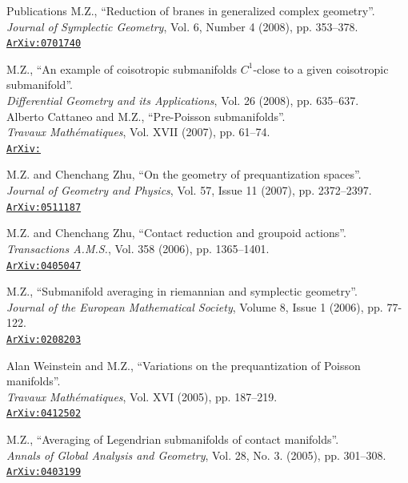 \documentclass[12p]{resume}
\newcommand{\arxiv}[1]{\href{http://arxiv.org/abs/#1}{\texttt{ArXiv:\allowbreak#1}}}%
\begin{document}
\begin{category}{Publi\-cations}
\citembullet  M.Z., ``Reduction of branes in generalized complex geometry''.\\
\textit{Journal of Symplectic Geometry}, Vol. 6, Number 4 (2008), pp. 353--378. \\
\href{https://arxiv.org/abs/math/0701740}{\texttt{ArXiv:0701740}}

\citembullet
M.Z., ``An example of coisotropic submanifolds $C^1$-close to a given coisotropic submanifold''.\\
\textit{Differential Geometry and its Applications}, Vol. 26 (2008), pp. 635--637.\\
 

\citembullet  Alberto Cattaneo and M.Z., ``Pre-Poisson submanifolds''.\\\textit{Travaux Math\'ematiques}, Vol. XVII (2007), pp. 61--74.\\
\arxiv{0710.5772}

\citembullet  M.Z. and Chenchang Zhu, ``On the geometry of prequantization spaces''.\\
\textit{Journal of Geometry and Physics},
Vol. 57, Issue 11 (2007), pp. 2372--2397.\\
\href{https://arxiv.org/abs/math/0511187}{\texttt{ArXiv:0511187}}

\citembullet M.Z. and Chenchang Zhu, ``Contact reduction and groupoid actions''.\\
\textit{Transactions A.M.S.}, Vol. 358 (2006), pp. 1365--1401.\\
\href{https://arxiv.org/abs/math/0405047}{\texttt{ArXiv:0405047}}

\citembullet M.Z., ``Submanifold averaging in riemannian and symplectic geometry''.\\
\textit{Journal of the European Mathematical Society}, Volume 8, Issue 1 (2006), pp. 77-122.\\
\href{https://arxiv.org/abs/math/0208203}{\texttt{ArXiv:0208203}}

\citembullet
Alan Weinstein and M.Z., ``Variations on the prequantization of Poisson manifolds''.\\
\textit{Travaux Math\'ematiques}, Vol. XVI (2005), pp. 187--219.\\
\href{https://arxiv.org/abs/math/0412502}{\texttt{ArXiv:0412502}}

\citembullet
M.Z., ``Averaging of Legendrian submanifolds of contact manifolds''. \\
\textit{Annals of Global Analysis and Geometry}, Vol. 28, No. 3. (2005), pp. 301--308.\\
\href{https://arxiv.org/abs/math/0403199}{\texttt{ArXiv:0403199}}

\end{category} 
\end{document}
